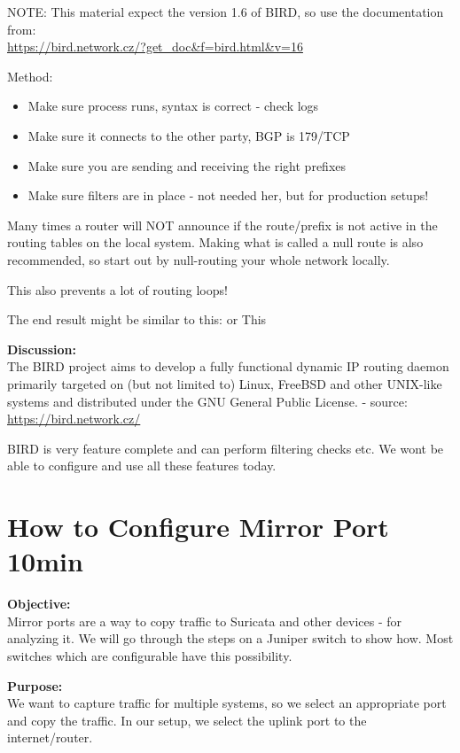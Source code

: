 \documentclass[a4paper,11pt,notitlepage]{report}
\begin{document}
NOTE: This material expect the version 1.6 of BIRD, so use the documentation from:\\
\url{https://bird.network.cz/?get_doc&f=bird.html&v=16}

Method:
\begin{itemize}
\item Make sure process runs, syntax is correct - check logs
\item Make sure it connects to the other party, BGP is 179/TCP
\item Make sure you are sending and receiving the right prefixes
\item Make sure filters are in place - not needed her, but for production setups!
\end{itemize}

Many times a router will NOT announce if the route/prefix is not active in the routing tables on the local system. Making what is called a null route is also recommended, so start out by null-routing your whole network locally.

This also prevents a lot of routing loops!

The end result might be similar to this:
or This



{\bf Discussion:}\\
The BIRD project aims to develop a fully functional dynamic IP routing daemon primarily targeted on (but not limited to) Linux, FreeBSD and other UNIX-like systems and distributed under the GNU General Public License.
- source: \url{https://bird.network.cz/}

BIRD is very feature complete and can perform filtering checks etc. We wont be able to configure and use all these features today.


\chapter{How to Configure Mirror Port 10min}
\label{ex:mirrorport}


{\bf Objective:} \\
Mirror ports are a way to copy traffic to Suricata and other devices - for analyzing it. We will go through the steps on a Juniper switch to show how.
Most switches which are configurable have this possibility.


{\bf Purpose:}\\
We want to capture traffic for multiple systems, so we select an appropriate port and copy the traffic. In our setup, we select the uplink port to the internet/router.
\end{document}
